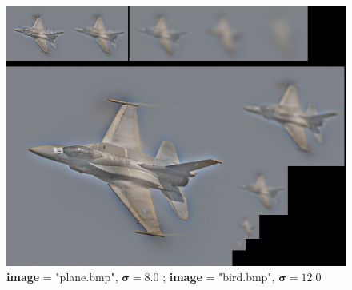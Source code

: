 \documentclass{article}
\begin{document}
\begin{figure}[hbt!]
	\centering
	\includegraphics[width=.9\textwidth]{assets/ex1-A/bird_plane_s12_s8_c.png}
	\caption{\textbf{image} = "plane.bmp", $\boldsymbol{\sigma} = 8.0$ ; \textbf{image} = "bird.bmp", $\boldsymbol{\sigma} = 12.0$}
\end{figure}

\newpage
\end{document}
